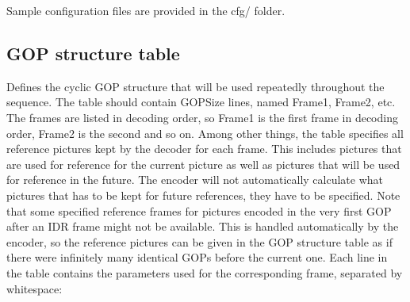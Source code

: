 \documentclass[a4paper,11pt]{jctvcdoc}
\begin{document}
Sample configuration files are provided in the cfg/ folder.

\subsection{GOP structure table}
\label{sec:gop-structure}
Defines the cyclic GOP structure that will be used repeatedly
throughout the sequence. The table should contain GOPSize lines,
named Frame1, Frame2, etc. The frames are listed in decoding
order, so Frame1 is the first frame in decoding order, Frame2 is
the second and so on. Among other things, the table specifies all
reference pictures kept by the decoder for each frame. This
includes pictures that are used for reference for the current
picture as well as pictures that will be used for reference in
the future. The encoder will not automatically calculate what
pictures that has to be kept for future references, they have to
be specified. Note that some specified reference frames for
pictures encoded in the very first GOP after an IDR frame might
not be available. This is handled automatically by the encoder,
so the reference pictures can be given in the GOP structure table
as if there were infinitely many identical GOPs before the
current one. Each line in the table contains the parameters used
for the corresponding frame, separated by whitespace:
\end{document}
